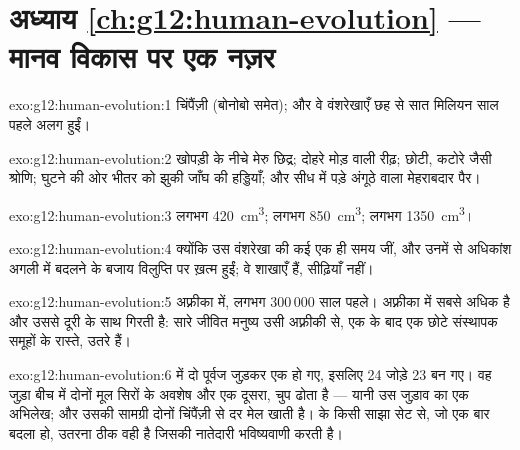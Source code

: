 \section*{अध्याय \ref{ch:g12:human-evolution} --- मानव विकास पर एक नज़र}

\begin{solution}{exo:g12:human-evolution:1}
चिंपैंज़ी (बोनोबो समेत); और वे वंशरेखाएँ छह से सात मिलियन साल पहले अलग
हुईं।
\end{solution}

\begin{solution}{exo:g12:human-evolution:2}
खोपड़ी के नीचे मेरु छिद्र; दोहरे मोड़ वाली रीढ़; छोटी, कटोरे जैसी श्रोणि;
घुटने की ओर भीतर को झुकी जाँघ की हड्डियाँ; और सीध में पड़े अंगूठे वाला
मेहराबदार पैर।
\end{solution}

\begin{solution}{exo:g12:human-evolution:3}
लगभग \qty{420}{cm^3}; लगभग \qty{850}{cm^3}; लगभग \qty{1350}{cm^3}।
\end{solution}

\begin{solution}{exo:g12:human-evolution:4}
क्योंकि उस वंशरेखा की कई  एक ही समय जीं, और उनमें से अधिकांश अगली
में बदलने के बजाय विलुप्ति पर ख़त्म हुईं; वे  शाखाएँ हैं, सीढ़ियाँ
नहीं।
\end{solution}

\begin{solution}{exo:g12:human-evolution:5}
अफ़्रीका में, लगभग 300\,000 साल पहले।  अफ़्रीका में सबसे
अधिक है और उससे दूरी के साथ गिरती है: सारे जीवित मनुष्य उसी अफ़्रीकी 
से, एक के बाद एक छोटे संस्थापक समूहों के रास्ते, उतरे हैं।
\end{solution}

\begin{solution}{exo:g12:human-evolution:6}
 में दो पूर्वज  जुड़कर एक हो गए, इसलिए 24 जोड़े 23 बन
गए। वह जुड़ा  बीच में दोनों मूल सिरों के अवशेष और एक दूसरा, चुप
 ढोता है --- यानी उस जुड़ाव का एक अभिलेख; और उसकी  सामग्री
दोनों चिंपैंज़ी  से  दर  मेल खाती है।  के किसी
साझा सेट से, जो एक बार बदला हो, उतरना ठीक वही है जिसकी नातेदारी भविष्यवाणी
करती है।
\end{solution}

